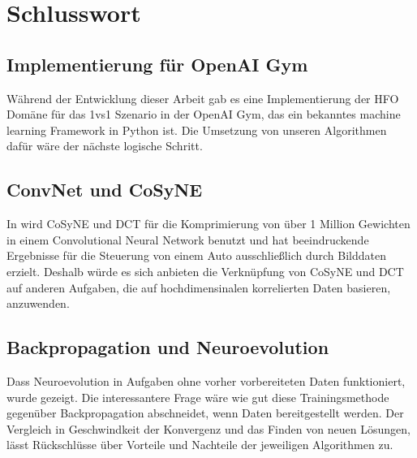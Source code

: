 \newpage

    \section{Schlusswort}

        \subsection{Implementierung für OpenAI Gym}
            Während der Entwicklung dieser Arbeit gab es eine Implementierung der HFO Domäne für das 1vs1 Szenario in der OpenAI Gym, das ein bekanntes machine learning Framework in Python ist. Die Umsetzung von unseren Algorithmen dafür wäre der nächste logische Schritt.

        \subsection{ConvNet und CoSyNE}
            In \cite{cosyne4} wird CoSyNE und DCT für die Komprimierung von über 1 Million Gewichten in einem Convolutional Neural Network benutzt und hat beeindruckende Ergebnisse für die Steuerung von einem Auto ausschließlich durch Bilddaten erzielt. Deshalb würde es sich anbieten die Verknüpfung von CoSyNE und DCT auf anderen Aufgaben, die auf hochdimensinalen korrelierten Daten basieren, anzuwenden.

        \subsection{Backpropagation und Neuroevolution}
            Dass Neuroevolution in Aufgaben ohne vorher vorbereiteten Daten funktioniert, wurde gezeigt. Die interessantere Frage wäre wie gut diese Trainingsmethode gegenüber Backpropagation abschneidet, wenn Daten bereitgestellt werden. Der Vergleich in Geschwindkeit der Konvergenz und das Finden von neuen Lösungen, lässt Rückschlüsse über Vorteile und Nachteile der jeweiligen Algorithmen zu.

